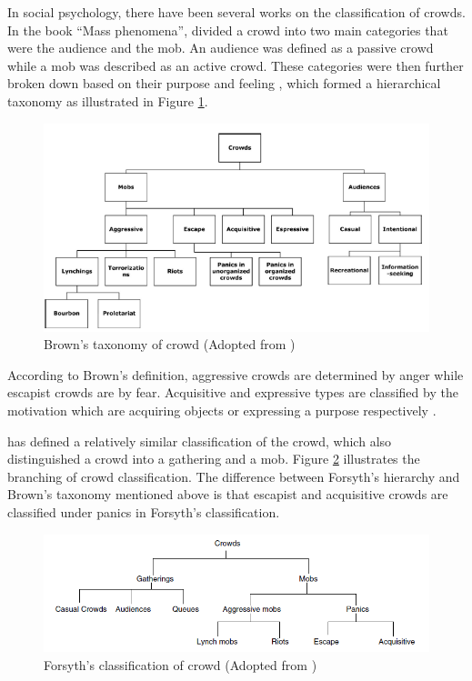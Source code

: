 In social psychology, there have been several works on the classification of crowds. In the book ``Mass phenomena'', \citet{Brown1954} divided a crowd into two main categories that were the audience and the mob. An audience was defined as a passive crowd while a mob was described as an active crowd. These categories were then further broken down based on their purpose and feeling \citep{Pelechano2008}, which formed a hierarchical taxonomy as illustrated in Figure \ref{fig:brownCrowdType}.

\begin{figure}[!htbp] 
	\centering    
	\includegraphics[width=1.0\textwidth]{BrownCrowdType}
	\caption{Brown's taxonomy of crowd (Adopted from \citet{Pelechano2008})}
	\label{fig:brownCrowdType}
\end{figure}


According to Brown’s definition, aggressive crowds are determined by anger while escapist crowds are by fear. Acquisitive and expressive types are classified by the motivation which are acquiring objects or expressing a purpose respectively \citep{Durupinar2010}.

\citet{Forsyth2009} has defined a relatively similar classification of the crowd, which also distinguished a crowd into a gathering and a mob. Figure \ref{fig:forsythCrowdType} illustrates the branching of crowd classification. The difference between Forsyth’s hierarchy and Brown’s taxonomy mentioned above is that escapist and acquisitive crowds are classified under panics in Forsyth's classification. 

\begin{figure}[!htbp]
	\centering    
	\includegraphics[width=1.0\textwidth]{ForsythCrowdType}
	\caption{Forsyth's classification of crowd (Adopted from \citet{klupfel2005models})}
	\label{fig:forsythCrowdType}
\end{figure}

